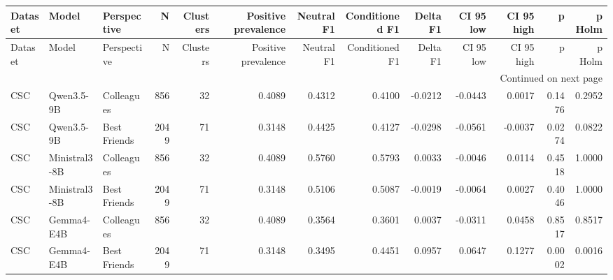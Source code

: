 \begin{longtable}{lllrrrrrrrrrr}
\toprule
Dataset & Model & Perspective & N & Clusters & Positive prevalence & Neutral F1 & Conditioned F1 & Delta F1 & CI 95 low & CI 95 high & p & p Holm \\
\midrule
\endfirsthead
\toprule
Dataset & Model & Perspective & N & Clusters & Positive prevalence & Neutral F1 & Conditioned F1 & Delta F1 & CI 95 low & CI 95 high & p & p Holm \\
\midrule
\endhead
\midrule
\multicolumn{13}{r}{Continued on next page} \\
\midrule
\endfoot
\bottomrule
\endlastfoot
CSC & Qwen3.5-9B & Colleagues & 856 & 32 & 0.4089 & 0.4312 & 0.4100 & -0.0212 & -0.0443 & 0.0017 & 0.1476 & 0.2952 \\
CSC & Qwen3.5-9B & Best Friends & 2049 & 71 & 0.3148 & 0.4425 & 0.4127 & -0.0298 & -0.0561 & -0.0037 & 0.0274 & 0.0822 \\
CSC & Ministral3-8B & Colleagues & 856 & 32 & 0.4089 & 0.5760 & 0.5793 & 0.0033 & -0.0046 & 0.0114 & 0.4518 & 1.0000 \\
CSC & Ministral3-8B & Best Friends & 2049 & 71 & 0.3148 & 0.5106 & 0.5087 & -0.0019 & -0.0064 & 0.0027 & 0.4046 & 1.0000 \\
CSC & Gemma4-E4B & Colleagues & 856 & 32 & 0.4089 & 0.3564 & 0.3601 & 0.0037 & -0.0311 & 0.0458 & 0.8517 & 0.8517 \\
CSC & Gemma4-E4B & Best Friends & 2049 & 71 & 0.3148 & 0.3495 & 0.4451 & 0.0957 & 0.0647 & 0.1277 & 0.0002 & 0.0016 \\
\end{longtable}
